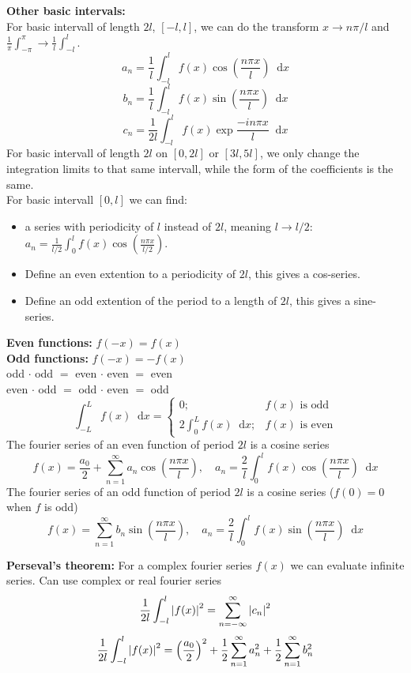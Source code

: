 \documentclass[a4paper, 10pt]{article}
\newcommand*\diff{\mathop{}\!\mathrm{d}}
\begin{document}
\begin{multicols*}{3}
\textbf{Other basic intervals:}\\
For basic intervall of length $2l$, $[-l, l]$, we can do the transform $x\rightarrow n\pi/l$ and $\frac{1}{\pi}\int_{-\pi}^\pi \rightarrow \frac{1}{l}\int_{-l}^l$.
$$ a_n = \frac{1}{l}\int_{-l}^l f(x) \cos{\left(\frac{n\pi x}{l}\right)} \diff x$$
$$ b_n = \frac{1}{l}\int_{-l}^l f(x) \sin{\left(\frac{n\pi x}{l}\right)} \diff x$$
$$ c_n = \frac{1}{2l}\int_{-l}^l f(x) \exp{\frac{-in\pi x}{l}} \diff x$$
For basic intervall of length $2l$ on $[0, 2l]$ or $[3l, 5l]$, we only change the integration limits to that same intervall, while the form of the coefficients is the same.\\
For basic intervall $[0, l]$ we can find:
\begin{itemize}
  \item a series with periodicity of $l$ instead of $2l$, meaning $l\rightarrow l/2$: $a_n = \frac{1}{l/2}\int_0^l f(x)\cos{\left( \frac{n\pi x}{l/2} \right)}$.
  \item Define an even extention to a periodicity of $2l$, this gives a cos-series.
  \item Define an odd extention of the period to a length of $2l$, this gives a sine-series.
\end{itemize}
\textbf{Even functions:} $f(-x)=f(x)$\\
\textbf{Odd  functions:} $f(-x)=-f(x)$\\
odd $\cdot$ odd $=$ even $\cdot$ even $=$ even\\
even $\cdot$ odd $=$ odd $\cdot$ even $=$ odd
\begin{equation*} \int_{-L}^{L}f(x) \diff x = \begin{cases}
0; & f(x) \text{ is odd} \\
2\int_0^L f(x) \diff x; & f(x) \text{ is even}
\end{cases} \end{equation*}
The fourier series of an even function of period $2l$ is a cosine series
$$f(x)= \frac{a_0}{2} + \sum_{n=1}^{\infty} a_n \cos{\left( \frac{n\pi x}{l} \right)},\quad a_n = \frac{2}{l}\int_0^lf(x)\cos{\left( \frac{n\pi x}{l} \right)}\diff x $$
The fourier series of an odd function of period $2l$ is a cosine series ($f(0)=0$ when $f$ is odd)
$$f(x)= \sum_{n=1}^{\infty} b_n \sin{\left( \frac{n\pi x}{l} \right)},\quad a_n = \frac{2}{l}\int_0^lf(x)\sin{\left( \frac{n\pi x}{l} \right)}\diff x $$

\textbf{Perseval's theorem:}
For a complex fourier series $f(x)$ we can evaluate infinite series. Can use complex or real fourier series
$$ \frac{1}{2l}\int_{-l}^{l} \abs{f(x)}^2 = \sum_{n=-\infty}^{\infty} \abs{c_n}^2$$
$$ \frac{1}{2l}\int_{-l}^{l} \abs{f(x)}^2 = \left(\frac{a_0}{2}\right)^2 + \frac{1}{2}\sum_{n=1}^{\infty} a_n^2 + \frac{1}{2}\sum_{n=1}^{\infty} b_n^2$$

\end{multicols*}
\end{document}
